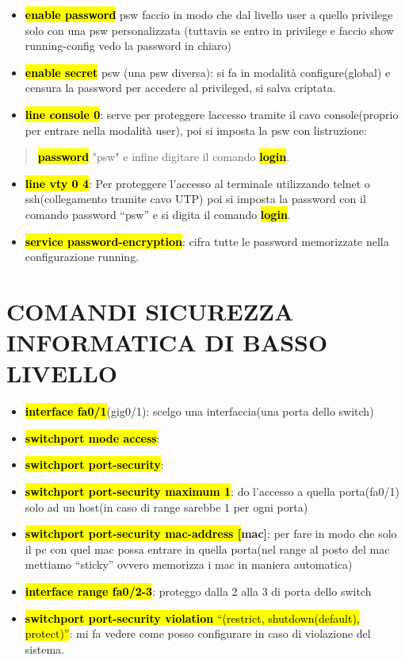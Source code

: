 \begin{itemize}
\item
  \textbf{\hl{enable password}} psw faccio in modo che dal livello user
  a quello privilege solo con una psw personalizzata (tuttavia se entro
  in privilege e faccio show running-config vedo la password in chiaro)
\item
  \textbf{\hl{enable secret}} psw (una psw diversa): si fa in modalità
  configure(global) e censura la password per accedere al privileged, si
  salva criptata.
\item
  \textbf{\hl{line console 0}}: serve per proteggere
  l\textquotesingle accesso tramite il cavo console(proprio per entrare
  nella modalità user), poi si imposta la psw con
  l\textquotesingle istruzione:
\end{itemize}

\begin{quote}
\hl{\textbf{password}} "psw" e infine digitare il comando
\textbf{\hl{login}}.
\end{quote}

\begin{itemize}
\item
  \textbf{\hl{line vty 0 4}}: Per proteggere l'accesso al terminale
  utilizzando telnet o ssh(collegamento tramite cavo UTP) poi si imposta
  la password con il comando password ``psw'' e si digita il comando
  \textbf{\hl{login}}.
\item
  \textbf{\hl{service password-encryption}}: cifra tutte le password
  memorizzate nella configurazione running.
\end{itemize}

\section{COMANDI SICUREZZA INFORMATICA DI BASSO
LIVELLO}\label{comandi-sicurezza-informatica-di-basso-livello}

\begin{itemize}
\item
  \textbf{\hl{interface fa0/1}}(gig0/1): scelgo una interfaccia(una
  porta dello switch)
\item
  \textbf{\hl{switchport mode access}}:
\item
  \textbf{\hl{switchport port-security}}:
\item
  \textbf{\hl{switchport port-security maximum 1}}: do l'accesso a
  quella porta(fa0/1) solo ad un host(in caso di range sarebbe 1 per
  ogni porta)
\item
  \textbf{\hl{switchport port-security mac-address {[}}mac{]}}: per fare
  in modo che solo il pc con quel mac possa entrare in quella porta(nel
  range al posto del mac mettiamo ``sticky'' ovvero memorizza i mac in
  maniera automatica)
\item
  \textbf{\hl{interface range fa0/2-3}}: proteggo dalla 2 alla 3 di
  porta dello switch
\item
  \hl{\textbf{switchport port-security violation} ``(restrict,
  shutdown(default), protect)''}: mi fa vedere come posso configurare in
  caso di violazione del sistema.
\end{itemize}

